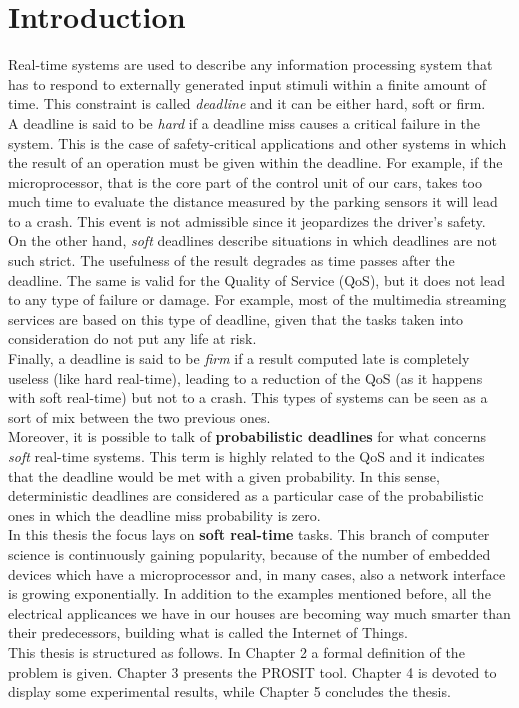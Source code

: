 \chapter{Introduction}\label{chp:introduction}


Real-time systems \cite{hardrealtime} are used to describe any information processing system that has to respond to externally generated input stimuli within a finite amount of time. This constraint is called \emph{deadline} and it can be either hard, soft or firm.\\
A deadline is said to be \emph{hard} if a deadline miss causes a critical failure in the system. This is the case of safety-critical applications and other systems in which the result of an operation must be given within the deadline. For example, if the microprocessor, that is the core part of the control unit of our cars, takes too much time to evaluate the distance measured by the parking sensors it will lead to a crash. This event is not admissible since it jeopardizes the driver's safety.\\
On the other hand, \emph{soft} deadlines describe situations in which deadlines are not such strict. The usefulness of the result degrades as time passes after the deadline. The same is valid for the Quality of Service (QoS), but it does not lead to any type of failure or damage. For example, most of the multimedia streaming services are based on this type of deadline, given that the tasks taken into consideration do not put any life at risk.\\
Finally, a deadline is said to be \emph{firm} if a result computed late is completely useless (like hard real-time), leading to a reduction of the QoS (as it happens with soft real-time) but not to a crash. This types of systems can be seen as a sort of mix between the two previous ones.\\
Moreover, it is possible to talk of \textbf{probabilistic deadlines} \cite{abeni} for what concerns \emph{soft} real-time systems. This term is highly related to the QoS and it indicates that the deadline would be met with a given probability. In this sense, deterministic deadlines are considered as a particular case of the probabilistic ones in which the deadline miss probability is zero.\\ 
In this thesis the focus lays on \textbf{soft real-time} tasks. This branch of computer science is continuously gaining popularity, because of the number of embedded devices which have a microprocessor and, in many cases, also a network interface is growing exponentially. In addition to the examples mentioned before, all the electrical applicances we have in our houses are becoming way much smarter than their predecessors, building what is called the Internet of Things.\\
This thesis is structured as follows. In Chapter 2 a formal definition of the problem is given. Chapter 3 presents the PROSIT tool. Chapter 4 is devoted to display some experimental results, while Chapter 5 concludes the thesis.      
